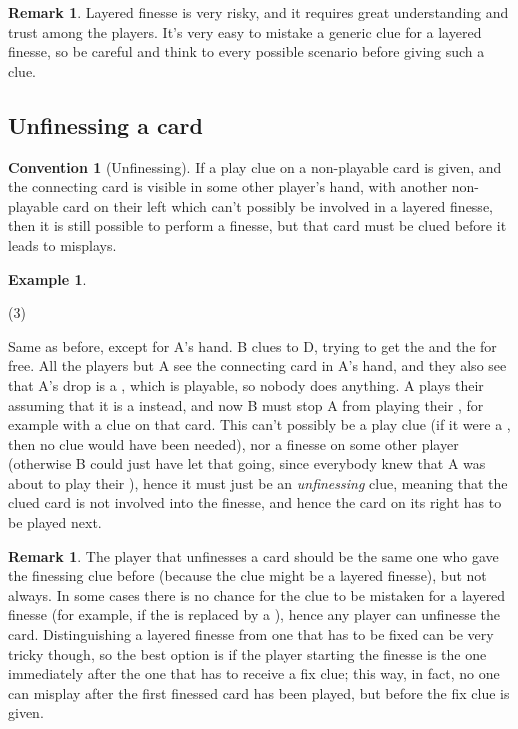 \documentclass[a4paper]{article}
\theoremstyle{plain}
\theoremstyle{definition}
\newtheorem{remark}[theorem]{Remark}
\newtheorem{example}[theorem]{Example}
\newtheorem{convention}[theorem]{Convention}
\begin{document}
\begin{remark}
	Layered finesse is very risky, and it requires great understanding and trust among the players. It's very easy to mistake a generic clue for a layered finesse, so be careful and think to every possible scenario before giving such a clue.
\end{remark}

\subsection{Unfinessing a card}

\begin{convention}[Unfinessing]
	\label{unfinessing}
	If a play clue on a non-playable card is given, and the connecting card is visible in some other player's hand, with another non-playable card on their left which can't possibly be involved in a layered finesse, then it is still possible to perform a finesse, but that card must be clued before it leads to misplays.
\end{convention}

\begin{example}
	\hfill
	\begin{tasks}(3)
		\task[+]      
		\task[A]    
		\task[B]    
		\task[C]     
		\task[D]    
		\task[E]    
	\end{tasks}
	
	Same as before, except for A's hand. B clues  to D, trying to get the  and the  for free. All the players but A see the connecting card in A's hand, and they also see that A's drop is a , which is playable, so nobody does anything. A plays their  assuming that it is a  instead, and now B must stop A from playing their , for example with a  clue on that card. This can't possibly be a play clue (if it were a , then no clue would have been needed), nor a finesse on some other player (otherwise B could just have let that going, since everybody knew that A was about to play their ), hence it must just be an \textit{unfinessing} clue, meaning that the clued card is not involved into the finesse, and hence the card on its right has to be played next.
\end{example}

\begin{remark}
	The player that unfinesses a card should be the same one who gave the finessing clue before (because the clue might be a layered finesse), but not always. In some cases there is no chance for the clue to be mistaken for a layered finesse (for example, if the  is replaced by a ), hence any player can unfinesse the card. Distinguishing a layered finesse from one that has to be fixed can be very tricky though, so the best option is if the player starting the finesse is the one immediately after the one that has to receive a fix clue; this way, in fact, no one can misplay after the first finessed card has been played, but before the fix clue is given.
\end{remark}
\end{document}
